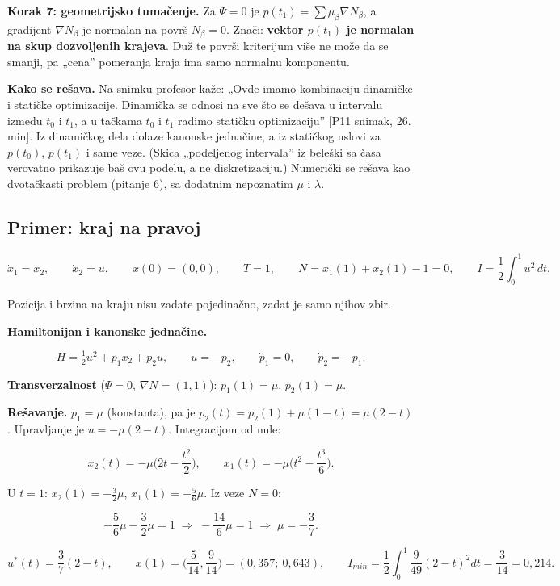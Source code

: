 \documentclass[11pt,a4paper,parskip=half,headsepline,numbers=noenddot]{scrartcl}
\DeclareRobustCommand{\izvor}[1]{{\small\color{izvorC}[#1]}}
\begin{document}
\textbf{Korak 7: geometrijsko tumačenje.} Za \(\Psi = 0\) je \(p(t_1) = \sum\mu_\beta\nabla N_\beta\), a gradijent \(\nabla N_\beta\) je normalan na površ \(N_\beta = 0\). Znači: \textbf{vektor \(p(t_1)\) je normalan na skup dozvoljenih krajeva}. Duž te površi kriterijum više ne može da se smanji, pa „cena'' pomeranja kraja ima samo normalnu komponentu.

\textbf{Kako se rešava.} Na snimku profesor kaže: „Ovde imamo kombinaciju dinamičke i statičke optimizacije. Dinamička se odnosi na sve što se dešava u intervalu između \(t_0\) i \(t_1\), a u tačkama \(t_0\) i \(t_1\) radimo statičku optimizaciju'' \izvor{P11 snimak, 26. min}. Iz dinamičkog dela dolaze kanonske jednačine, a iz statičkog uslovi za \(p(t_0)\), \(p(t_1)\) i same veze. (Skica „podeljenog intervala'' iz beleški sa časa verovatno prikazuje baš ovu podelu, a ne diskretizaciju.) Numerički se rešava kao dvotačkasti problem (pitanje 6), sa dodatnim nepoznatim \(\mu\) i \(\lambda\).

\subsection{Primer: kraj na pravoj}

\[\dot x_1 = x_2, \qquad \dot x_2 = u, \qquad x(0) = (0, 0), \qquad T = 1, \qquad N = x_1(1) + x_2(1) - 1 = 0, \qquad I = \frac12\int_0^1u^2\,dt .\]

Pozicija i brzina na kraju nisu zadate pojedinačno, zadat je samo njihov zbir.

\textbf{Hamiltonijan i kanonske jednačine.}

\[H = \tfrac12u^2 + p_1x_2 + p_2u, \qquad u = -p_2, \qquad \dot p_1 = 0, \qquad \dot p_2 = -p_1 .\]

\textbf{Transverzalnost} (\(\Psi = 0\), \(\nabla N = (1, 1)\)): \(p_1(1) = \mu\), \(p_2(1) = \mu\).

\textbf{Rešavanje.} \(p_1 = \mu\) (konstanta), pa je \(p_2(t) = p_2(1) + \mu(1 - t) = \mu(2 - t)\). Upravljanje je \(u = -\mu(2 - t)\). Integracijom od nule:

\[x_2(t) = -\mu\Big(2t - \frac{t^2}{2}\Big), \qquad x_1(t) = -\mu\Big(t^2 - \frac{t^3}{6}\Big) .\]

U \(t = 1\): \(x_2(1) = -\frac32\mu\), \(x_1(1) = -\frac56\mu\). Iz veze \(N = 0\):

\[-\frac56\mu - \frac32\mu = 1 \;\Rightarrow\; -\frac{14}{6}\mu = 1 \;\Rightarrow\; \mu = -\frac37 .\]

\[u^*(t) = \frac37(2 - t), \qquad x(1) = \Big(\frac{5}{14}, \frac{9}{14}\Big) = (0{,}357;\ 0{,}643), \qquad I_{min} = \frac12\int_0^1\frac{9}{49}(2 - t)^2dt = \frac{3}{14} = 0{,}214 .\]
\end{document}
